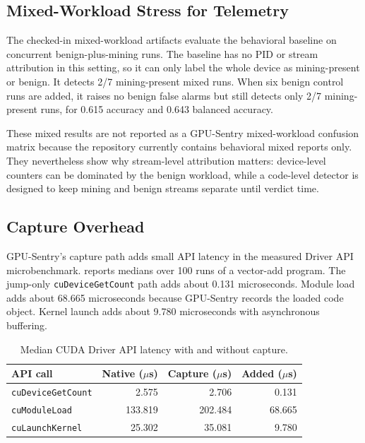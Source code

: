 \subsection{Mixed-Workload Stress for Telemetry}

The checked-in mixed-workload artifacts evaluate the behavioral baseline on concurrent benign-plus-mining runs. The baseline has no PID or stream attribution in this setting, so it can only label the whole device as mining-present or benign. It detects 2/7 mining-present mixed runs. When six benign control runs are added, it raises no benign false alarms but still detects only 2/7 mining-present runs, for 0.615 accuracy and 0.643 balanced accuracy.

These mixed results are not reported as a GPU-Sentry mixed-workload confusion matrix because the repository currently contains behavioral mixed reports only. They nevertheless show why stream-level attribution matters: device-level counters can be dominated by the benign workload, while a code-level detector is designed to keep mining and benign streams separate until verdict time.

\subsection{Capture Overhead}

GPU-Sentry's capture path adds small API latency in the measured Driver API microbenchmark.  reports medians over 100 runs of a vector-add program. The jump-only \texttt{cuDeviceGetCount} path adds about 0.131 microseconds. Module load adds about 68.665 microseconds because GPU-Sentry records the loaded code object. Kernel launch adds about 9.780 microseconds with asynchronous buffering.

\begin{table}[t]
    \centering
    \caption{Median CUDA Driver API latency with and without capture.}
    \label{tab:api_overhead}
    \footnotesize
    \begin{tabular}{lrrr}
        \toprule
        API call & Native ($\mu$s) & Capture ($\mu$s) & Added ($\mu$s) \\
        \midrule
        \texttt{cuDeviceGetCount} & 2.575 & 2.706 & 0.131 \\
        \texttt{cuModuleLoad} & 133.819 & 202.484 & 68.665 \\
        \texttt{cuLaunchKernel} & 25.302 & 35.081 & 9.780 \\
        \bottomrule
    \end{tabular}
\end{table}

